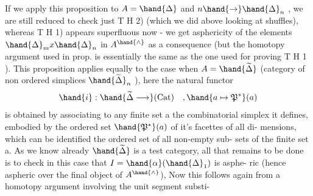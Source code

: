 If we apply this proposition to $A=\hand{\Delta}$ and $n \hand{\to} \hand{\Delta}_n$ , we are still
reduced to check just T H 2) (which we did above looking at shuffles),
whereas T H 1) appears superfluous now - we get asphericity of the
elements $\hand{\Delta}_m x \hand{\Delta}_n$ in $A^{\hand{\wedge}}$ as a consequence (but the homotopy argument used in 
prop. is essentially the same as the one used for proving T H 1 ). This
proposition applies equally to the case when $A = \hand{\widetilde{\Delta}}$ (category of non ordered
simplices $\hand{\widetilde{\Delta}}_n$ ), here the natural functor
\[ \hand{i} : \hand{\widetilde{\Delta} \longrightarrow} \text{(Cat)} \quad , \hand{a \mapsto \mathfrak{P}^*}(a) \]
is obtained by associating to any finite set a the combinatorial simplex
it defines, embodied by the ordered set $\hand{\mathfrak{P}^*}(a)$ of it's facettes of all di-%
mensions, which can be identified  the ordered set of all non-empty sub-%
sets of the finite set a. As we know already $\hand{\widetilde{\Delta}}$ is a test category, all
that remains to be done is to check in this case that $I = \hand{\alpha}(\hand{\Delta}_1)$ is asphe-%
ric (hence aspheric over the final object of $A^{\hand{\wedge}}$), Now this follows 
 again from a homotopy argument involving the unit segment substi-%
